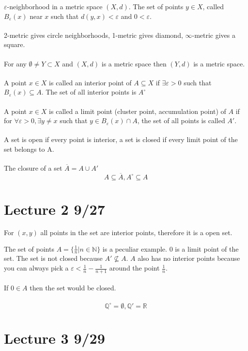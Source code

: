 \documentclass[12pt]{article}
\begin{document}
$\varepsilon$-neighborhood in a metric space $(X,d)$. The set of points $y \in X$, called $B_\varepsilon (x) $ near $x$ such that $d(y,x) < \varepsilon$ and $0 < \varepsilon$.\\\\
2-metric gives circle neighborhoods, 1-metric gives diamond, $\infty$-metric gives a square. \\\\
For any $\emptyset \neq Y \subset X$ and $(X,d)$ is a metric space then $(Y,d)$ is a metric space.
\\\\
A point  $x \in X$ is called an interior point of $A \subseteq X$ if $\exists \varepsilon > 0$ such that $B_\varepsilon (x) \subseteq A$. The set of all interior points is $A^\circ$\\\\

A point $x \in X$ is called a limit point (cluster point, accumulation point) of $A$ if for $\forall \varepsilon > 0, \exists y \neq x$ such that $y \in B_\varepsilon(x) \cap A$, the set of all points is called $A'$. \\\\
A set is open if every point is interior, a set is closed if every limit point of the set belongs to A. 
\\\\
The closure of a set $\overline A = A \cup A'$
$$A \subseteq \overline{A}, A^\circ \subseteq A$$
\newpage
\section{Lecture 2 9/27}

For $(x,y)$ all points in the set are interior points, therefore it is a open set. 

The set of points $A = \{\frac 1 n | n \in \mathbb{N}\}$ is a peculiar example. $0$ is a limit point of the set. The set is not closed because $A' \not \subseteq A$. $A$ also has no interior points because you can always pick a $\varepsilon < \frac 1n - \frac{1}{n+1}$ around the point $\frac 1n$.  \\\\
If $0 \in A$ then the set would be closed. \\\\
$$\mathbb{Q}^\circ = \emptyset, \mathbb{Q}' = \mathbb{R}$$


\newpage 
\section{Lecture 3 9/29}
\end{document}
